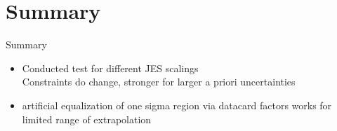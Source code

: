 \section{Summary}
\begin{frame}{Summary}
\begin{itemize}
\item Conducted test for different JES scalings\\
\rar Constraints do change, stronger for larger a priori uncertainties

\item artificial equalization of one sigma region via datacard factors works for limited range of extrapolation
\end{itemize}

\end{frame}
